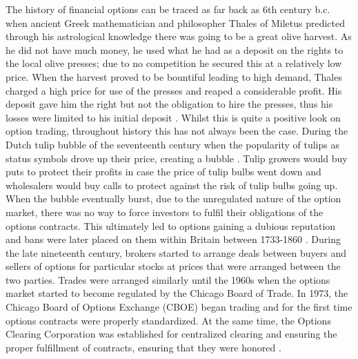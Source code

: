 The history of financial options can be traced as far back as 6th century b.c. when ancient Greek mathematician and philosopher Thales of Miletus predicted through his astrological knowledge there was going to be a great olive harvest. As he did not have much money, he used what he had as a deposit on the rights to the local olive presses; due to no competition he secured this at a relatively low price. When the harvest proved to be bountiful leading to high demand, Thales charged a high price for use of the presses and reaped a considerable profit. His deposit gave him the right but not the obligation to hire the presses, thus his losses were limited to his initial deposit \cite{OptionFirst, 1877aristotle}.
\nline
Whilst this is quite a positive look on option trading, throughout history this has not always been the case. During the Dutch tulip bubble of the seventeenth century when the popularity of tulips as status symbols drove up their price, creating a bubble \cite{dash2011tulipomania}. Tulip growers would buy puts to protect their profits in case the price of tulip bulbs went down and wholesalers would buy calls to protect against the risk of tulip bulbs going up. When the bubble eventually burst, due to the unregulated nature of the option market, there was no way to force investors to fulfil their obligations of the options contracts. This ultimately led to options gaining a dubious reputation and bans were later placed on them within Britain between 1733-1860 \cite{OptionBan}. 
\nline
During the late nineteenth century, brokers started to arrange deals between buyers and sellers of options for particular stocks at prices that were arranged between the two parties. Trades were arranged similarly until the 1960s when the options market started to become regulated by the Chicago Board of Trade. In 1973, the Chicago Board of Options Exchange (CBOE) began trading and for the first time options contracts were properly standardized. At the same time, the Options Clearing Corporation was established for centralized clearing and ensuring the proper fulfillment of contracts, ensuring that they were honored \cite{markham2002financial}.


